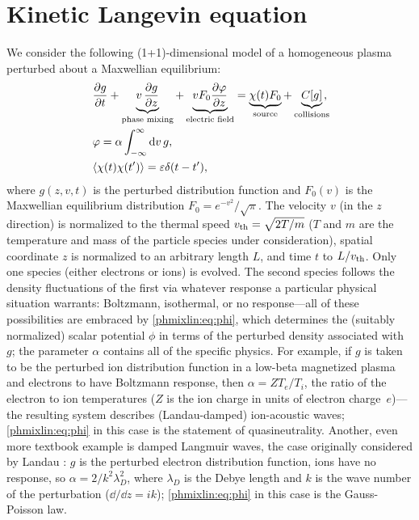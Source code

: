  
\section{Kinetic Langevin equation}
\label{phmixlin:sec:kin}

We consider the following (1+1)-dimensional model of a homogeneous plasma 
perturbed about a Maxwellian equilibrium: 
\begin{align}
&\frac{\partial g}{\partial t} + \underbrace{v\,\frac{\partial g}{\partial z}}_{\text{phase mixing}} 
+ \underbrace{v F_0 \frac{\partial \varphi}{\partial z}}_{\text{electric field}} = 
\underbrace{\chi(t) F_0}_{\text{source}} +
\underbrace{C[g]}_{\text{collisions}}\!\!\!, \label{phmixlin:eq:g} \\
&\varphi  = \alpha \int_{-\infty}^\infty {\rm d} v\, g, \label{phmixlin:eq:phi} \\
& \langle \chi(t) \chi(t') \rangle  = \varepsilon \delta (t-t'), \nonumber
\end{align}
where $g(z,v,t)$ is the perturbed distribution 
function and $F_0(v)$ is the Maxwellian equilibrium distribution
$F_0=e^{-v^2}/\sqrt{\pi}$. The velocity $v$ (in the $z$ direction) 
is normalized to the thermal speed $v_{\rm th} = \sqrt{2T/m}$ 
($T$ and $m$ are the temperature and mass of the particle species under consideration), 
spatial coordinate $z$ is normalized to an arbitrary length $L$, and time $t$ to $L/v_{\rm th}$.
Only one species (either electrons or ions) is evolved. 
The second species follows the density fluctuations of the first via 
whatever response a particular physical situation warrants: 
Boltzmann, isothermal, or no response---all of these possibilities 
are embraced by \eqref{phmixlin:eq:phi}, which determines the (suitably normalized) 
scalar potential $\phi$ in terms of the perturbed density associated with~$g$; 
the parameter $\alpha$ contains all of the specific physics. 
For example, if $g$ is taken to be the perturbed ion distribution function 
in a low-beta magnetized plasma and electrons to have Boltzmann response, 
then $\alpha=ZT_e/T_i$, the ratio of the electron to ion temperatures ($Z$ is the ion charge in 
units of electron charge~$e$)---the resulting system describes (Landau-damped) ion-acoustic waves;
\eqref{phmixlin:eq:phi} in this case is the statement of quasineutrality. 
Another, even more textbook example is damped Langmuir waves, the case 
originally considered by Landau \cite{landau46}: $g$ is the perturbed electron distribution function, 
ions have no response, so $\alpha=2/k^2\lambda_{D}^2$, where 
$\lambda_{D}$ is the Debye length and $k$ is the wave number of the 
perturbation ($\dd/\dd z = ik$); \eqref{phmixlin:eq:phi} in this case is the Gauss-Poisson law. 

